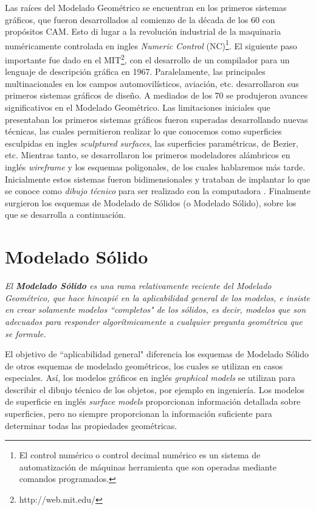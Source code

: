 Las raíces del Modelado Geométrico se encuentran en los primeros sistemas gráficos, que fueron desarrollados al comienzo de la década de los 60 con propósitos CAM. Esto di lugar a la revolución industrial de la maquinaria numéricamente controlada en ingles \textit{Numeric Control} (NC)\footnote{El control numérico o control decimal numérico es un sistema de automatización de máquinas herramienta que son operadas mediante comandos programados.}.
El siguiente paso importante fue dado en el MIT\footnote{http://web.mit.edu/}, con el desarrollo de un compilador para un lenguaje de descripción gráfica en 1967. Paralelamente, las principales multinacionales en los campos automovilísticos, aviación, etc. desarrollaron sus primeros sistemas gráficos de diseño.
A mediados de los 70 se produjeron avances significativos en el Modelado Geométrico. Las limitaciones iniciales que presentaban los primeros sistemas gráficos fueron superadas desarrollando nuevas técnicas, las cuales permitieron realizar lo que conocemos como superficies esculpidas en ingles \textit{sculptured surfaces}, las superficies paramétricas, de Bezier, etc.
Mientras tanto, se desarrollaron los primeros modeladores alámbricos en inglés \textit{wireframe} y los esquemas poligonales, de los cuales hablaremos más tarde. Inicialmente estos sistemas fueron bidimensionales y trataban de implantar lo que se conoce como \textit{dibujo técnico} para ser realizado con la computadora \citep{Ramos2012}.
Finalmente surgieron los esquemas de Modelado de Sólidos (o Modelado Sólido), sobre los que se desarrolla a continuación.



\section{Modelado Sólido}
\textit{El \textbf{Modelado Sólido} es una rama relativamente reciente del Modelado Geométrico, que hace hincapié en la aplicabilidad general de los modelos, e insiste en crear solamente modelos ``completos" de los sólidos, es decir, modelos que son adecuados para responder algorítmicamente a cualquier pregunta geométrica que se formule.} \citep{Ramos2012} 

El objetivo de ``aplicabilidad general" diferencia los esquemas de Modelado Sólido de otros esquemas de modelado geométricos, los cuales se utilizan en casos especiales. Así, los modelos gráficos en inglés \textit{graphical models} se utilizan para describir el dibujo técnico de los objetos, por ejemplo en ingeniería.
Los modelos de superficie en inglés \textit{surface models} proporcionan información detallada sobre superficies, pero no siempre proporcionan la información suficiente para determinar todas las propiedades geométricas. 

